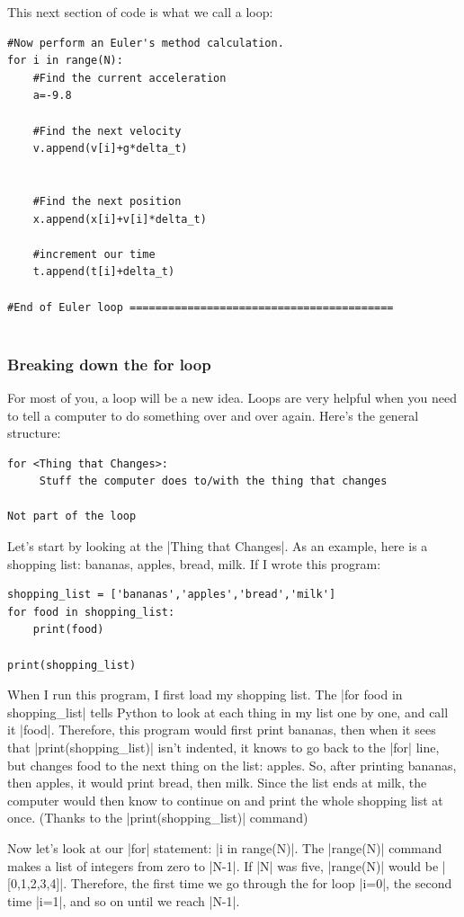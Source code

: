 \documentclass{book}
\begin{document}
This next section of code is what we call a loop:
\begin{lstlisting}
#Now perform an Euler's method calculation.
for i in range(N):
    #Find the current acceleration
    a=-9.8
    
    #Find the next velocity
    v.append(v[i]+g*delta_t)    
    
    
    #Find the next position
    x.append(x[i]+v[i]*delta_t)
    
    #increment our time
    t.append(t[i]+delta_t)

#End of Euler loop =========================================


\end{lstlisting}

\subsubsection{Breaking down the for loop}
For most of you, a loop will be a new idea. Loops are very helpful when you need to tell a computer to do something over and over again.  Here's the general structure:
\begin{lstlisting}
for <Thing that Changes>:
     Stuff the computer does to/with the thing that changes

Not part of the loop
\end{lstlisting}

Let's start by looking at the |Thing that Changes|.   As an example, here is a shopping list: bananas, apples, bread, milk.  If I wrote this program:
\begin{lstlisting}
shopping_list = ['bananas','apples','bread','milk']
for food in shopping_list:
    print(food)

print(shopping_list)
\end{lstlisting}
When I run this program, I first load my shopping list.  The |for food in shopping_list| tells Python to look at each thing in my list one by one, and call it |food|.  Therefore, this program would first print bananas, then when it sees that |print(shopping_list)| isn't indented, it knows to go back to the |for| line, but changes food to the next thing on the list: apples.  So, after printing bananas, then apples, it would print bread, then milk.  Since the list ends at milk, the computer would then know to continue on and print the whole shopping list at once. (Thanks to the |print(shopping_list)| command)

Now let's look at our |for| statement: |i in range(N)|.  The |range(N)| command makes a list of integers from zero to |N-1|.  If |N| was five, |range(N)| would be |[0,1,2,3,4]|.  Therefore, the first time we go through the for loop |i=0|, the second time |i=1|, and so on until we reach |N-1|.
\end{document}
